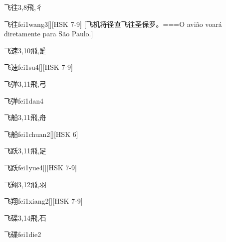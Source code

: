 \begin{Entry}{飞往}{3,8}{⾶,⼻}
  \begin{Phonetics}{飞往}{fei1wang3}[][HSK 7-9]
    [飞机将径直飞往圣保罗。===O avião voará diretamente para São Paulo.]
  \end{Phonetics}
\end{Entry}

\begin{Entry}{飞速}{3,10}{⾶,⾡}
  \begin{Phonetics}{飞速}{fei1su4}[][HSK 7-9]
  \end{Phonetics}
\end{Entry}

\begin{Entry}{飞弹}{3,11}{⾶,⼸}
  \begin{Phonetics}{飞弹}{fei1dan4}
  \end{Phonetics}
\end{Entry}

\begin{Entry}{飞船}{3,11}{⾶,⾈}
  \begin{Phonetics}{飞船}{fei1chuan2}[][HSK 6]
  \end{Phonetics}
\end{Entry}

\begin{Entry}{飞跃}{3,11}{⾶,⾜}
  \begin{Phonetics}{飞跃}{fei1yue4}[][HSK 7-9]
  \end{Phonetics}
\end{Entry}

\begin{Entry}{飞翔}{3,12}{⾶,⽻}
  \begin{Phonetics}{飞翔}{fei1xiang2}[][HSK 7-9]
  \end{Phonetics}
\end{Entry}

\begin{Entry}{飞碟}{3,14}{⾶,⽯}
  \begin{Phonetics}{飞碟}{fei1die2}
  \end{Phonetics}
\end{Entry}

